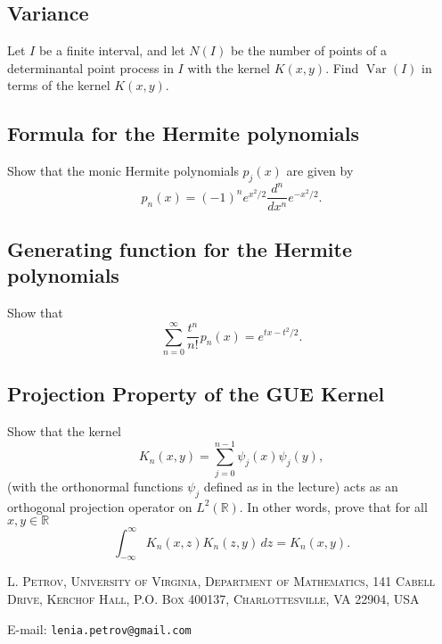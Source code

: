 \documentclass[letterpaper,11pt,oneside,reqno]{article}
\numberwithin{equation}{section}
\newcommand{\ssp}{\hspace{1pt}}
\theoremstyle{definition}
\begin{document}
\subsection{Variance}

Let $I$ be a finite interval,
and let $N(I)$ be the number of points of a determinantal point process in $I$
with the kernel $K(x,y)$.
Find $\operatorname{Var}(I)$
in terms of the kernel $K(x,y)$.


\subsection{Formula for the Hermite polynomials}

Show that the monic Hermite polynomials \(p_j(x)\) are given by 
\begin{equation*}
	p_n(x)=(-1)^n e^{x^2/2}\frac{d^n}{dx^n}e^{-x^2/2}.
\end{equation*}

\subsection{Generating function for the Hermite polynomials}

Show that 
\begin{equation*}
	\sum_{n=0}^\infty \frac{t^n}{n!} \ssp p_n(x)=e^{tx-t^2/2}.
\end{equation*}


\subsection{Projection Property of the GUE Kernel}
Show that the kernel 
\[
K_n(x,y)=\sum_{j=0}^{n-1}\psi_j(x)\psi_j(y),
\]
(with the orthonormal functions \(\psi_j\) defined as in the lecture) acts as an orthogonal projection operator on \(L^2(\mathbb{R})\). In other words, prove that for all \(x,y\in\mathbb{R}\)
\[
\int_{-\infty}^\infty K_n(x,z)K_n(z,y)\,dz = K_n(x,y).
\]









\medskip

\textsc{L. Petrov, University of Virginia, Department of Mathematics, 141 Cabell Drive, Kerchof Hall, P.O. Box 400137, Charlottesville, VA 22904, USA}

E-mail: \texttt{lenia.petrov@gmail.com}
\end{document}
